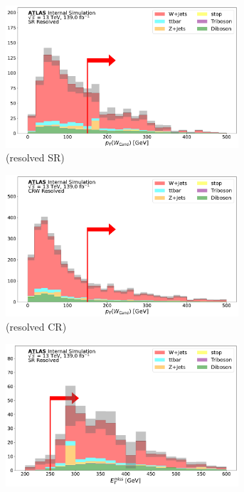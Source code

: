      \begin{figure}[htbp] \ContinuedFloat
    \begin{subfigure}{0.45\textwidth}
     \includegraphics[width = 0.95\textwidth]{Figures/App_SR_CR_distributions/SR1L_Resolved/WCand_pt_N_1.pdf}
    \caption{\Wcandpt (resolved SR)}
     \end{subfigure}
    \begin{subfigure}{0.45\textwidth}
     \includegraphics[width = 0.95\textwidth]{Figures/App_SR_CR_distributions/CRW_Resolved/WCand_pt_N_1.pdf}
     \caption{\Wcandpt (resolved \wjets CR)}
     \end{subfigure}   
    \begin{subfigure}{0.45\textwidth}
     \includegraphics[width = 0.95\textwidth]{Figures/App_SR_CR_distributions/SR1L_Resolved/MetTST_met_N_1.pdf}

\end{subfigure}
\end{figure}
